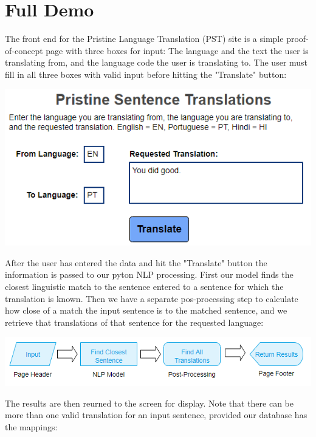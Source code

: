 \documentclass[runningheads]{llncs}
\begin{document}
	
	\section{Full Demo}
	The front end for the Pristine Language Translation (PST) site is a simple proof-of-concept page with three boxes for input: The language and the text the user is translating from, and the language code the user is translating to. The user must fill in all three boxes with valid input before hitting the "Translate" button:

	\begin{minipage}{\linewidth}
		\begin{center}
			\includegraphics[width=\linewidth]{Screen_top.png}
			\label{fig:Language Input}
			\vspace*{1cm}
		\end{center}
	\end{minipage}
	\afterpage{\clearpage}
After the user has entered the data and hit the "Translate" button the information is passed to our pyton NLP processing. First our model finds the closest linguistic match to the sentence entered to a sentence for which the translation is known. Then we have a separate pos-processing step to calculate how close of a match the input sentence is to the matched sentence, and we retrieve that translations of that sentence for the requested language:

	\begin{minipage}{\linewidth}
		\begin{center}
			\includegraphics[width=\linewidth]{Process_Map.png}
			\label{fig:Process Map}
			\vspace*{1cm}
		\end{center}
	\end{minipage}
	\afterpage{\clearpage}
The results are then reurned to the screen for display. Note that there can be more than one valid translation for an input sentence, provided our database has the mappings:
\end{document}
